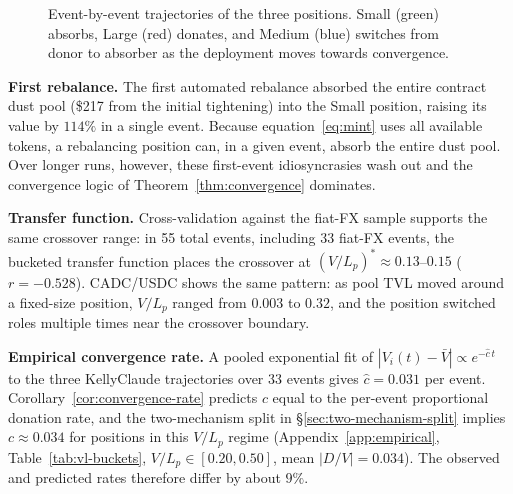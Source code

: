 \documentclass[11pt,a4paper]{article}
\theoremstyle{plain}
\begin{document}
\begin{figure}[H]
\caption{Event-by-event trajectories of the three positions. Small (green) absorbs, Large (red) donates, and Medium (blue) switches from donor to absorber as the deployment moves towards convergence.}
\label{fig:vl-sweep}
\end{figure}

\textbf{First rebalance.} The first automated rebalance absorbed the entire contract dust pool (\$217 from the initial tightening) into the Small position, raising its value by $114\%$ in a single event. Because equation~\eqref{eq:mint} uses all available tokens, a rebalancing position can, in a given event, absorb the entire dust pool. Over longer runs, however, these first-event idiosyncrasies wash out and the convergence logic of Theorem~\ref{thm:convergence} dominates.

\textbf{Transfer function.} Cross-validation against the fiat-FX sample supports the same crossover range: in 55 total events, including 33 fiat-FX events, the bucketed transfer function places the crossover at $(V/L_p)^* \approx 0.13$--$0.15$ ($r = -0.528$). CADC/USDC shows the same pattern: as pool TVL moved around a fixed-size position, $V/L_p$ ranged from $0.003$ to $0.32$, and the position switched roles multiple times near the crossover boundary.

\textbf{Empirical convergence rate.} A pooled exponential fit of $|V_i(t) - \bar V| \propto e^{-\hat c\, t}$ to the three KellyClaude trajectories over 33 events gives $\hat c = 0.031$ per event. Corollary~\ref{cor:convergence-rate} predicts $c$ equal to the per-event proportional donation rate, and the two-mechanism split in \S\ref{sec:two-mechanism-split} implies $c \approx 0.034$ for positions in this $V/L_p$ regime (Appendix~\ref{app:empirical}, Table~\ref{tab:vl-buckets}, $V/L_p \in [0.20, 0.50]$, mean $|D/V| = 0.034$). The observed and predicted rates therefore differ by about $9\%$.
\end{document}
